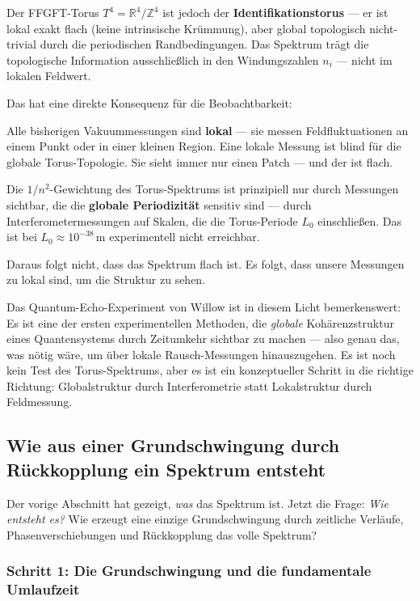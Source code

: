Der FFGFT-Torus $T^4 = \mathbb{R}^4/\mathbb{Z}^4$ ist jedoch der
\textbf{Identifikationstorus} — er ist lokal exakt flach (keine intrinsische
Krümmung), aber global topologisch nicht-trivial durch die periodischen
Randbedingungen. Das Spektrum trägt die topologische Information
ausschließlich in den Windungszahlen $n_i$ — nicht im lokalen Feldwert.

Das hat eine direkte Konsequenz für die Beobachtbarkeit:

\begin{conclusionBox}
Alle bisherigen Vakuummessungen sind \textbf{lokal} — sie messen Feldfluktuationen
an einem Punkt oder in einer kleinen Region. Eine lokale Messung ist blind für die
globale Torus-Topologie. Sie sieht immer nur einen Patch — und der ist flach.

Die $1/n^2$-Gewichtung des Torus-Spektrums ist prinzipiell nur durch Messungen
sichtbar, die die \textbf{globale Periodizität} sensitiv sind — durch
Interferometermessungen auf Skalen, die die Torus-Periode $L_0$ einschließen.
Das ist bei $L_0 \approx 10^{-38}$\,m experimentell nicht erreichbar.

Daraus folgt nicht, dass das Spektrum flach ist. Es folgt, dass unsere
Messungen zu lokal sind, um die Struktur zu sehen.
\end{conclusionBox}

Das Quantum-Echo-Experiment von Willow ist in diesem Licht bemerkenswert: Es ist
eine der ersten experimentellen Methoden, die \emph{globale} Kohärenzstruktur eines
Quantensystems durch Zeitumkehr sichtbar zu machen — also genau das, was nötig wäre,
um über lokale Rausch-Messungen hinauszugehen. Es ist noch kein Test des
Torus-Spektrums, aber es ist ein konzeptueller Schritt in die richtige Richtung:
Globalstruktur durch Interferometrie statt Lokalstruktur durch Feldmessung.

\subsection{Wie aus einer Grundschwingung durch Rückkopplung ein Spektrum entsteht}

Der vorige Abschnitt hat gezeigt, \emph{was} das Spektrum ist. Jetzt die Frage:
\emph{Wie entsteht es?} Wie erzeugt eine einzige Grundschwingung durch zeitliche
Verläufe, Phasenverschiebungen und Rückkopplung das volle Spektrum?

\subsubsection*{Schritt 1: Die Grundschwingung und die fundamentale Umlaufzeit}

